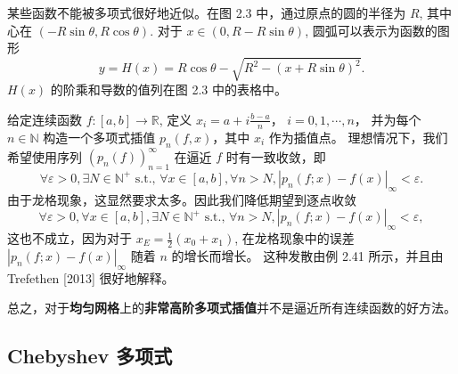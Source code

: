 \documentclass[a4paper]{ctexart}
\begin{document}
 某些函数不能被多项式很好地近似。在图 2.3 中，通过原点的圆的半径为 $R$, 
其中心在 $(-R \sin \theta, R \cos \theta)$. 对于 $x \in (0, R - R \sin \theta)$, 圆弧可以表示为函数的图形
\[
y = H(x) = R \cos \theta - \sqrt{R^2 - (x + R \sin \theta)^2}.
\]
$H(x)$ 的阶乘和导数的值列在图 2.3 中的表格中。

 给定连续函数 $f : [a, b] \rightarrow \mathbb{R}$, 
定义 $x_i = a + i\frac{b-a}{n}$， $i = 0, 1, \cdots , n$， 并为每个 $n \in \mathbb{N}$ 构造一个多项式插值 $p_n(f, x)$，其中 $x_i$ 作为插值点。
理想情况下，我们希望使用序列 $(p_n(f))_{n=1}^{\infty}$ 在逼近 $f$ 时有一致收敛，即
\[
\forall \varepsilon > 0, \exists N \in \mathbb{N}^+ \text{ s.t., } \forall x \in [a, b], \forall n > N, |p_n(f ; x) - f (x)|_{\infty} < \varepsilon.
\]
由于龙格现象，这显然要求太多。因此我们降低期望到逐点收敛
\[
\forall \varepsilon > 0, \forall x \in [a, b], \exists N \in \mathbb{N}^+ \text{ s.t., } \forall n > N, |p_n(f ; x) - f (x)|_{\infty} < \varepsilon,
\]
这也不成立，因为对于 $x_E = \frac{1}{2}(x_0 + x_1)$, 在龙格现象中的误差 $|p_n(f ; x) - f (x)|_{\infty}$ 随着 $n$ 的增长而增长。
这种发散由例 2.41 所示，并且由 Trefethen [2013] 很好地解释。

总之，对于{\bfseries 均匀网格}上的{\bfseries 非常高阶多项式插值}并不是逼近所有连续函数的好方法。

\subsection{Chebyshev 多项式}



\end{document}
